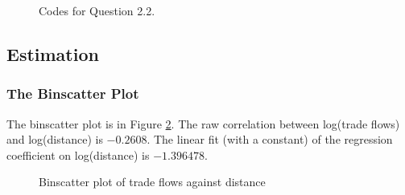 \documentclass[12pt]{article}
\theoremstyle{definition}
\begin{document}
\begin{figure}[H]
    \noindent\caption{Codes for Question 2.2.}
    \begin{center}
        \label{q2_2}
    \end{center}
\end{figure}

\subsection{Estimation}

\subsubsection{The Binscatter Plot}

The binscatter plot is in Figure \ref{r2_3_1}. The raw correlation between log(trade flows) and log(distance) is $-0.2608$. The linear fit (with a constant) of the regression coefficient on  log(distance) is $-1.396478$.

\begin{figure}[H]
    \noindent\caption{Binscatter plot of trade flows against distance}
    \begin{center}
        \label{r2_3_1}
    \end{center}
\end{figure}
\end{document}
